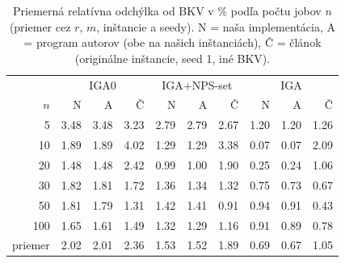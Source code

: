 \begin{table}[ht]
\centering
\small
\caption{Priemerná relatívna odchýlka od BKV v \% podľa počtu jobov $n$ (priemer cez $r$, $m$, inštancie a seedy). N = naša implementácia, A = program autorov (obe na našich inštanciách), Č = článok (originálne inštancie, seed 1, iné BKV).}
\label{tab:rpd_by_n}
\begin{tabular}{r|rrr|rrr|rrr}
\toprule
 & \multicolumn{3}{c}{IGA0} & \multicolumn{3}{c}{IGA+NPS-set} & \multicolumn{3}{c}{IGA} \\
$n$ & N & A & Č & N & A & Č & N & A & Č \\
\midrule
5 & 3.48 & 3.48 & 3.23 & 2.79 & 2.79 & 2.67 & 1.20 & 1.20 & 1.26 \\
10 & 1.89 & 1.89 & 4.02 & 1.29 & 1.29 & 3.38 & 0.07 & 0.07 & 2.09 \\
20 & 1.48 & 1.48 & 2.42 & 0.99 & 1.00 & 1.90 & 0.25 & 0.24 & 1.06 \\
30 & 1.82 & 1.81 & 1.72 & 1.36 & 1.34 & 1.32 & 0.75 & 0.73 & 0.67 \\
50 & 1.81 & 1.79 & 1.31 & 1.42 & 1.41 & 0.91 & 0.94 & 0.91 & 0.43 \\
100 & 1.65 & 1.61 & 1.49 & 1.32 & 1.29 & 1.16 & 0.91 & 0.89 & 0.78 \\
\midrule
priemer & 2.02 & 2.01 & 2.36 & 1.53 & 1.52 & 1.89 & 0.69 & 0.67 & 1.05 \\
\bottomrule
\end{tabular}
\end{table}
